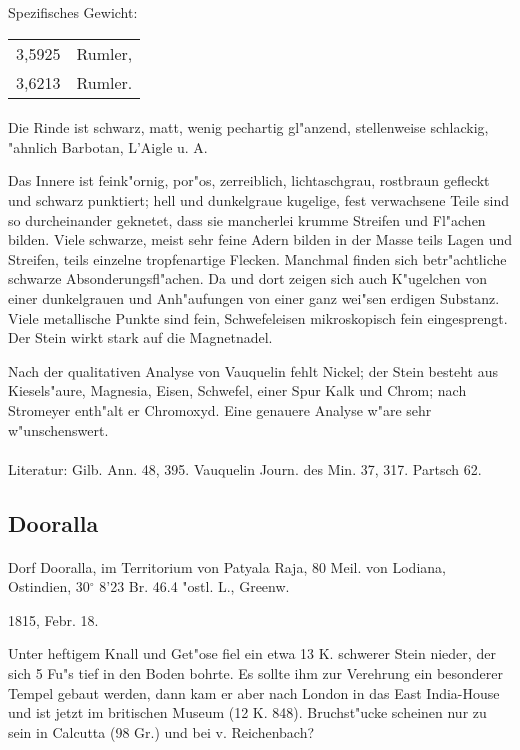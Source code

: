 \documentclass[a4paper, 11pt, oneside]{article}
\begin{document}
Spezifisches Gewicht:
\begin{table}[!ht]
    \centering
    \begin{tabular}{l l}
        3,5925 & Rumler,\\
        3,6213 & Rumler.
    \end{tabular}
\end{table}
\paragraph{}
Die Rinde ist schwarz, matt, wenig pechartig gl"anzend, stellenweise schlackig, "ahnlich Barbotan, L'Aigle u. A.

Das Innere ist feink"ornig, por"os, zerreiblich, lichtaschgrau, rostbraun gefleckt und schwarz punktiert; hell und dunkelgraue kugelige, fest verwachsene Teile sind so durcheinander geknetet, dass sie mancherlei krumme Streifen und Fl"achen bilden. Viele schwarze, meist sehr feine Adern bilden in der Masse teils Lagen und Streifen, teils einzelne tropfenartige Flecken. Manchmal finden sich betr"achtliche schwarze Absonderungsfl"achen. Da und dort zeigen sich auch K"ugelchen von einer dunkelgrauen und Anh"aufungen von einer ganz wei"sen erdigen Substanz. Viele metallische Punkte sind fein, Schwefeleisen mikroskopisch fein eingesprengt. Der Stein wirkt stark auf die Magnetnadel.

Nach der qualitativen Analyse von Vauquelin fehlt Nickel; der Stein besteht aus Kiesels"aure, Magnesia, Eisen, Schwefel, einer Spur Kalk und Chrom; nach Stromeyer enth"alt er Chromoxyd. Eine genauere Analyse w"are sehr w"unschenswert.
\footnotesize
\paragraph{}
Literatur: Gilb. Ann. 48, 395. Vauquelin Journ. des Min. 37, 317. Partsch 62.
\subsection{Dooralla}
\normalsize
\paragraph{}
Dorf Dooralla, im Territorium von Patyala Raja, 80 Meil. von Lodiana, Ostindien, 30$^\circ$ 8'23 Br. 46.4 "ostl. L., Greenw.

1815, Febr. 18.

Unter heftigem Knall und Get"ose fiel ein etwa 13 K. schwerer Stein nieder, der sich 5 Fu"s tief in den Boden bohrte. Es sollte ihm zur Verehrung ein besonderer Tempel gebaut werden, dann kam er aber nach London in das East India-House und ist jetzt im britischen Museum (12 K. 848). Bruchst"ucke scheinen nur zu sein in Calcutta (98 Gr.) und bei v. Reichenbach?
\end{document}
